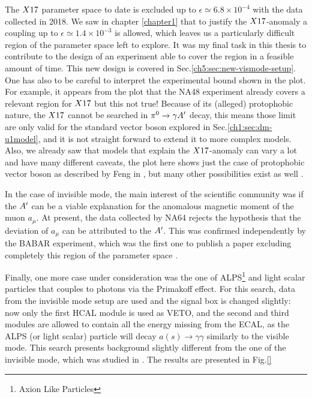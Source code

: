The $X17$ parameter space to date is excluded up to $\epsilon \simeq 6.8 \times 10^{-4}$ with the data collected in 2018. We saw in chapter \ref{chapter1} that to justify the $X17$-anomaly a coupling up to $\epsilon \simeq 1.4 \times 10^{-3}$ is allowed, which leaves us a particularly difficult region of the parameter space left to explore. It was my final task in this thesis to contribute to the design of an experiment able to cover the region in a feasible amount of time. This new design is covered in Sec.\ref{ch5:sec:new-vismode-setup}. One has also to be careful to interpret the experimental bound shown in the plot. For example, it appears from the plot that the NA48 experiment already covers a relevant region for $X17$ but this not true! Because of its (alleged) protophobic nature, the $X17$ cannot be searched in $\pi^0 \rightarrow \gamma A'$ decay, this means those limit are only valid for the standard vector boson explored in Sec.\ref{ch1:sec:dm-u1model}, and it is not straight forward to extend it to more complex models. Also, we already saw that models that explain the $X17$-anomaly can vary a lot and have many different caveats, the plot here shows just the case of protophobic vector boson as described by Feng in \cite{Feng:2016jff}, but many other possibilities exist as well \cite{PhysRevD.95.035017}.

In the case of invisible mode, the main interest of the scientific community was if the $A'$ can be a viable explanation for the anomalous magnetic moment of the muon $a_{\mu}$. At present, the data collected by NA64 rejects the hypothesis that the deviation of $a_{\mu}$ can be attributed to the $A'$. This was confirmed independently by the BABAR experiment, which was the first one to publish a paper excluding completely this region of the parameter space \cite{PhysRevLett.119.131804}.

Finally, one more case under consideration was the one of ALPS\footnote{Axion Like Particles} and light scalar particles that couples to photons via the Primakoff effect. For this search, data from the invisible mode setup are used and the signal box is changed slightly: now only the first HCAL module is used as VETO, and the second and third modules are allowed to contain all the energy missing from the ECAL, as the ALPS (or light scalar) particle will decay $a(s) \to \gamma \gamma$ similarly to the visible mode. This search presents background slightly different from the one of the invisible mode, which was studied in \cite{Banerjee:2020fue}. The results are presented in Fig.\ref{}

